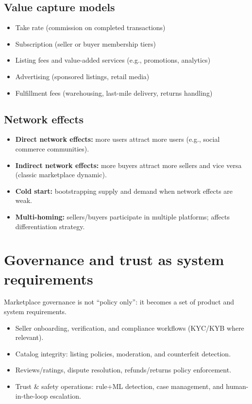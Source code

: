 \subsection{Value capture models}
\begin{itemize}
  \item Take rate (commission on completed transactions)
  \item Subscription (seller or buyer membership tiers)
  \item Listing fees and value-added services (e.g., promotions, analytics)
  \item Advertising (sponsored listings, retail media)
  \item Fulfillment fees (warehousing, last-mile delivery, returns handling)
\end{itemize}

\subsection{Network effects}
\begin{itemize}
  \item \textbf{Direct network effects:} more users attract more users (e.g., social commerce communities).
  \item \textbf{Indirect network effects:} more buyers attract more sellers and vice versa (classic marketplace dynamic).
  \item \textbf{Cold start:} bootstrapping supply and demand when network effects are weak.
  \item \textbf{Multi-homing:} sellers/buyers participate in multiple platforms; affects differentiation strategy.
\end{itemize}

\section{Governance and trust as system requirements}
Marketplace governance is not ``policy only'': it becomes a set of product and system requirements.
\begin{itemize}
  \item Seller onboarding, verification, and compliance workflows (KYC/KYB where relevant).
  \item Catalog integrity: listing policies, moderation, and counterfeit detection.
  \item Reviews/ratings, dispute resolution, refunds/returns policy enforcement.
  \item Trust \& safety operations: rule+ML detection, case management, and human-in-the-loop escalation.
\end{itemize}

